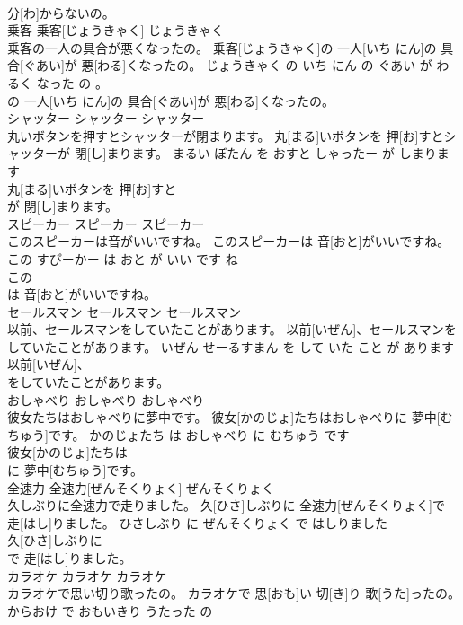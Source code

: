 \documentclass[8pt]{extreport}
\begin{document}
\begin{CJK}{UTF8}{min}
\\	分[わ]からないの。			
\\	乗客	乗客[じょうきゃく]	じょうきゃく	
\\	乗客の一人の具合が悪くなったの。	乗客[じょうきゃく]の 一人[いち にん]の 具合[ぐあい]が 悪[わる]くなったの。	じょうきゃく の いち にん の ぐあい が わるく なった の 。	
\\	の 一人[いち にん]の 具合[ぐあい]が 悪[わる]くなったの。			
\\	シャッター	シャッター	シャッター	
\\	丸いボタンを押すとシャッターが閉まります。	丸[まる]いボタンを 押[お]すとシャッターが 閉[し]まります。	まるい ぼたん を おすと しゃったー が しまります	
\\	丸[まる]いボタンを 押[お]すと
\\	が 閉[し]まります。			
\\	スピーカー	スピーカー	スピーカー	
\\	このスピーカーは音がいいですね。	このスピーカーは 音[おと]がいいですね。	この すぴーかー は おと が いい です ね	
\\	この
\\	は 音[おと]がいいですね。			
\\	セールスマン	セールスマン	セールスマン	
\\	以前、セールスマンをしていたことがあります。	以前[いぜん]、セールスマンをしていたことがあります。	いぜん せーるすまん を して いた こと が あります	
\\	以前[いぜん]、
\\	をしていたことがあります。			
\\	おしゃべり	おしゃべり	おしゃべり	
\\	彼女たちはおしゃべりに夢中です。	彼女[かのじょ]たちはおしゃべりに 夢中[むちゅう]です。	かのじょたち は おしゃべり に むちゅう です	
\\	彼女[かのじょ]たちは
\\	に 夢中[むちゅう]です。			
\\	全速力	全速力[ぜんそくりょく]	ぜんそくりょく	
\\	久しぶりに全速力で走りました。	久[ひさ]しぶりに 全速力[ぜんそくりょく]で 走[はし]りました。	ひさしぶり に ぜんそくりょく で はしりました	
\\	久[ひさ]しぶりに
\\	で 走[はし]りました。			
\\	カラオケ	カラオケ	カラオケ	
\\	カラオケで思い切り歌ったの。	カラオケで 思[おも]い 切[き]り 歌[うた]ったの。	からおけ で おもいきり うたった の	

\end{CJK}
\end{document}
